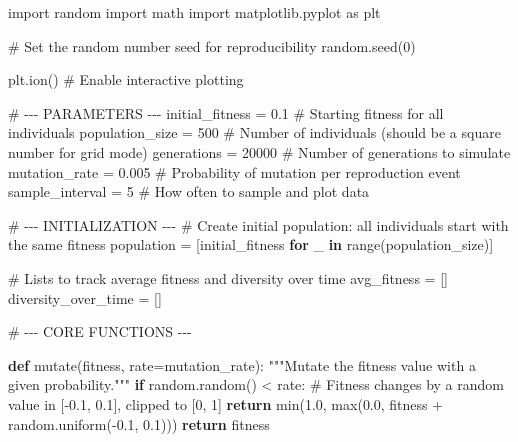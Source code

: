 \documentclass[
  letterpaper,
  DIV=11,
  numbers=noendperiod]{scrreprt}
\newenvironment{Shaded}{\begin{snugshade}}{\end{snugshade}}
\newcommand{\BuiltInTok}[1]{\textcolor[rgb]{0.00,0.23,0.31}{#1}}
\newcommand{\CommentTok}[1]{\textcolor[rgb]{0.37,0.37,0.37}{#1}}
\newcommand{\ControlFlowTok}[1]{\textcolor[rgb]{0.00,0.23,0.31}{\textbf{#1}}}
\newcommand{\DecValTok}[1]{\textcolor[rgb]{0.68,0.00,0.00}{#1}}
\newcommand{\FloatTok}[1]{\textcolor[rgb]{0.68,0.00,0.00}{#1}}
\newcommand{\ImportTok}[1]{\textcolor[rgb]{0.00,0.46,0.62}{#1}}
\newcommand{\KeywordTok}[1]{\textcolor[rgb]{0.00,0.23,0.31}{\textbf{#1}}}
\newcommand{\NormalTok}[1]{\textcolor[rgb]{0.00,0.23,0.31}{#1}}
\newcommand{\OperatorTok}[1]{\textcolor[rgb]{0.37,0.37,0.37}{#1}}
\theoremstyle{definition}
\theoremstyle{remark}
\begin{document}
\begin{tcolorbox}[enhanced jigsaw, leftrule=.75mm, colbacktitle=quarto-callout-note-color!10!white, coltitle=black, colback=white, left=2mm, bottomtitle=1mm, arc=.35mm, titlerule=0mm, breakable, bottomrule=.15mm, opacitybacktitle=0.6, colframe=quarto-callout-note-color-frame, title=\textcolor{quarto-callout-note-color}{\faInfo}\hspace{0.5em}{CODE FOR ``fitness without fitness''}, opacityback=0, toprule=.15mm, toptitle=1mm, rightrule=.15mm]

\begin{Shaded}
\begin{Highlighting}[]
\ImportTok{import}\NormalTok{ random}
\ImportTok{import}\NormalTok{ math}
\ImportTok{import}\NormalTok{ matplotlib.pyplot }\ImportTok{as}\NormalTok{ plt}

\CommentTok{\# Set the random number seed for reproducibility}
\NormalTok{random.seed(}\DecValTok{0}\NormalTok{)}

\NormalTok{plt.ion()  }\CommentTok{\# Enable interactive plotting}

\CommentTok{\# {-}{-}{-} PARAMETERS {-}{-}{-}}
\NormalTok{initial\_fitness }\OperatorTok{=} \FloatTok{0.1}            \CommentTok{\# Starting fitness for all individuals}
\NormalTok{population\_size }\OperatorTok{=} \DecValTok{500}             \CommentTok{\# Number of individuals (should be a square number for grid mode)}
\NormalTok{generations }\OperatorTok{=} \DecValTok{20000}               \CommentTok{\# Number of generations to simulate}
\NormalTok{mutation\_rate }\OperatorTok{=} \FloatTok{0.005}            \CommentTok{\# Probability of mutation per reproduction event}
\NormalTok{sample\_interval }\OperatorTok{=} \DecValTok{5}               \CommentTok{\# How often to sample and plot data}

\CommentTok{\# {-}{-}{-} INITIALIZATION {-}{-}{-}}
\CommentTok{\# Create initial population: all individuals start with the same fitness}
\NormalTok{population }\OperatorTok{=}\NormalTok{ [initial\_fitness }\ControlFlowTok{for}\NormalTok{ \_ }\KeywordTok{in} \BuiltInTok{range}\NormalTok{(population\_size)]}

\CommentTok{\# Lists to track average fitness and diversity over time}
\NormalTok{avg\_fitness }\OperatorTok{=}\NormalTok{ []}
\NormalTok{diversity\_over\_time }\OperatorTok{=}\NormalTok{ []}

\CommentTok{\# {-}{-}{-} CORE FUNCTIONS {-}{-}{-}}

\KeywordTok{def}\NormalTok{ mutate(fitness, rate}\OperatorTok{=}\NormalTok{mutation\_rate):}
    \CommentTok{"""Mutate the fitness value with a given probability."""}
    \ControlFlowTok{if}\NormalTok{ random.random() }\OperatorTok{\textless{}}\NormalTok{ rate:}
        \CommentTok{\# Fitness changes by a random value in [{-}0.1, 0.1], clipped to [0, 1]}
        \ControlFlowTok{return} \BuiltInTok{min}\NormalTok{(}\FloatTok{1.0}\NormalTok{, }\BuiltInTok{max}\NormalTok{(}\FloatTok{0.0}\NormalTok{, fitness }\OperatorTok{+}\NormalTok{ random.uniform(}\OperatorTok{{-}}\FloatTok{0.1}\NormalTok{, }\FloatTok{0.1}\NormalTok{)))}
    \ControlFlowTok{return}\NormalTok{ fitness}


\end{Highlighting}
\end{Shaded}
\end{tcolorbox}
\end{document}
